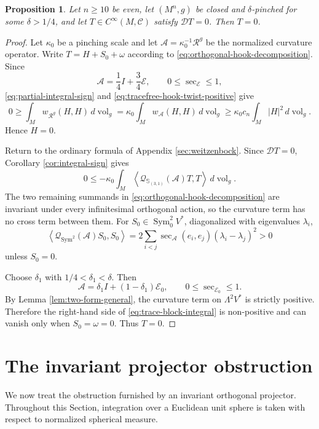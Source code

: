 \documentclass[reqno,11pt]{amsart}
\newtheorem{proposition}[theorem]{Proposition}
\theoremstyle{definition}
\newcommand{\Rop}{\mathscr R}
\newcommand{\cA}{\mathcal A}
\newcommand{\cQ}{\mathcal Q}
\newcommand{\cC}{\mathcal C}
\newcommand{\cE}{\mathcal E}
\newcommand{\Sym}{\operatorname{Sym}}
\newcommand{\vol}{\operatorname{vol}}
\newcommand{\cD}{\mathcal D}
\newcommand{\Hook}{\mathbb S_{(3,1)}}
\newcommand{\inner}[2]{\left\langle #1,#2\right\rangle}
\begin{document}
\begin{proposition}\label{prop:stable-cubic}
Let $n\geq10$ be even, let $(M^n,g)$ be closed and $\delta$-pinched for some
$\delta>1/4$, and let
$T\in C^\infty(M,\cC)$ satisfy $\cD T=0$. Then $T=0$.
\end{proposition}

\begin{proof}
Let $\kappa_0$ be a pinching scale and let $\cA=\kappa_0^{-1}\Rop^g$ be the
normalized curvature operator. Write $T=H+S_0+\omega$ according to
\eqref{eq:orthogonal-hook-decomposition}. Since
$$
  \cA=\frac14I+\frac34\cE,
  \qquad 0\leq\sec_{\cE}\leq1,
$$
\eqref{eq:partial-integral-sign} and
\eqref{eq:tracefree-hook-twist-positive} give
$$
  0\geq\int_Mw_{\Rop^g}(H,H)\,d\vol_g
  =\kappa_0\int_Mw_{\cA}(H,H)\,d\vol_g
  \geq\kappa_0c_n\int_M|H|^2\,d\vol_g.
$$
Hence $H=0$.

Return to the ordinary formula of Appendix \ref{sec:weitzenbock}. Since $\cD T=0$,
Corollary \ref{cor:integral-sign} gives
\begin{equation}\label{eq:trace-block-integral}
  0\leq-\kappa_0\int_M
  \inner{\cQ_{\Hook}(\cA)T}{T}\,d\vol_g.
\end{equation}
The two remaining summands in
\eqref{eq:orthogonal-hook-decomposition} are invariant under every
infinitesimal orthogonal action, so the curvature term has no cross term
between them. For $S_0\in\Sym^2_0V^*$, diagonalized with eigenvalues
$\lambda_i$,
\begin{equation*}
  \inner{\cQ_{\Sym^2}(\cA)S_0}{S_0}
  =2\sum_{i<j}\sec_{\cA}(e_i,e_j)(\lambda_i-\lambda_j)^2>0
\end{equation*}
unless $S_0=0$.

Choose $\delta_1$ with $1/4<\delta_1<\delta$. Then
$$
  \cA=\delta_1I+(1-\delta_1)\cE_0,
  \qquad 0\leq\sec_{\cE_0}\leq1.
$$
By Lemma \ref{lem:two-form-general}, the curvature term on $\Lambda^2V^*$ is
strictly positive. Therefore the right-hand side of
\eqref{eq:trace-block-integral} is non-positive and can vanish only when
$S_0=\omega=0$. Thus $T=0$.
\end{proof}

\section{The invariant projector obstruction}\label{sec:symmetric-projector}

We now treat the obstruction furnished by an invariant orthogonal projector.
Throughout this Section, integration over a Euclidean unit sphere is taken
with respect to normalized spherical measure.
\end{document}
